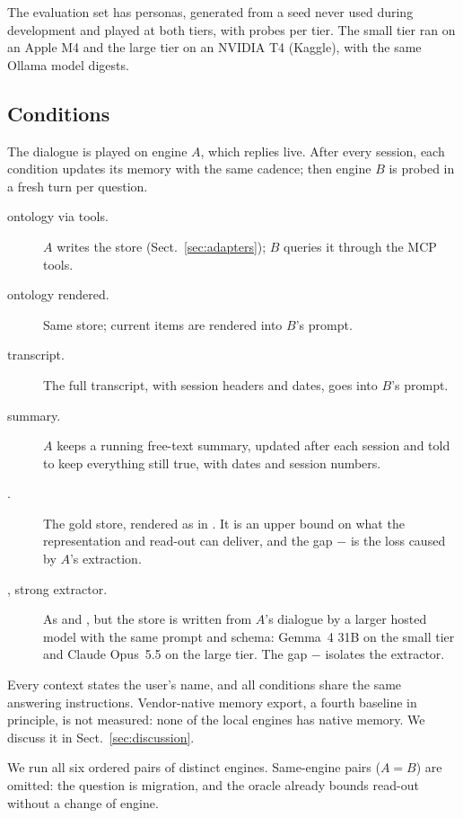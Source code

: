 The evaluation set has  personas, generated from a seed never used during
development and played at both tiers, with  probes per tier. The small tier ran
on an Apple M4 and the large tier on an NVIDIA T4 (Kaggle), with the same Ollama model digests.

\subsection{Conditions}

The dialogue is played on engine $A$, which replies live. After every session, each condition
updates its memory with the same cadence; then engine $B$ is probed in a fresh turn per question.
\begin{description}
  \item[ ontology via tools.] $A$ writes the store (Sect.~\ref{sec:adapters}); $B$
    queries it through the MCP tools.
  \item[ ontology rendered.] Same store; current items are rendered into $B$'s prompt.
  \item[ transcript.] The full transcript, with session headers and dates, goes into $B$'s
    prompt.
  \item[ summary.] $A$ keeps a running free-text summary, updated after each session and
    told to keep everything still true, with dates and session numbers.
  \item[.] The gold store, rendered as in . It is an upper bound on what the
    representation and read-out can deliver, and the gap $-$ is the loss
    caused by $A$'s extraction.
  \item[,  strong extractor.] As  and , but the store is
    written from $A$'s dialogue by a larger hosted model with the same prompt and schema:
    Gemma~4 31B on the small tier and Claude Opus~5.5 on the large tier. The gap
    $-$ isolates the extractor.
\end{description}
Every context states the user's name, and all conditions share the same answering instructions.
Vendor-native memory export, a fourth baseline in principle, is not measured: none of the local
engines has native memory. We discuss it in Sect.~\ref{sec:discussion}.

We run all six ordered pairs of distinct engines. Same-engine pairs ($A=B$) are omitted: the
question is migration, and the oracle already bounds read-out without a change of engine.

